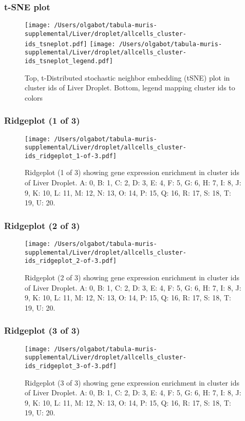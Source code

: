 \clearpage
\subsubsection{t-SNE plot}
\begin{figure}[h]
\centering
\texttt{[image: /Users/olgabot/tabula-muris-supplemental/Liver/droplet/allcells\_cluster-ids\_tsneplot.pdf]}
\texttt{[image: /Users/olgabot/tabula-muris-supplemental/Liver/droplet/allcells\_cluster-ids\_tsneplot\_legend.pdf]}
\caption{Top, t-Distributed stochastic neighbor embedding (tSNE) plot  in cluster ids of Liver Droplet. Bottom, legend mapping cluster ids to colors}
\end{figure}


\clearpage
\clearpage
\subsubsection{Ridgeplot (1 of 3)}
\begin{figure}[h]
\centering
\texttt{[image: /Users/olgabot/tabula-muris-supplemental/Liver/droplet/allcells\_cluster-ids\_ridgeplot\_1-of-3.pdf]}

\caption{ Ridgeplot (1 of 3)  showing gene expression enrichment in cluster ids of Liver Droplet. A: 0, B: 1, C: 2, D: 3, E: 4, F: 5, G: 6, H: 7, I: 8, J: 9, K: 10, L: 11, M: 12, N: 13, O: 14, P: 15, Q: 16, R: 17, S: 18, T: 19, U: 20.}
\end{figure}


\clearpage
\clearpage
\subsubsection{Ridgeplot (2 of 3)}
\begin{figure}[h]
\centering
\texttt{[image: /Users/olgabot/tabula-muris-supplemental/Liver/droplet/allcells\_cluster-ids\_ridgeplot\_2-of-3.pdf]}

\caption{ Ridgeplot (2 of 3)  showing gene expression enrichment in cluster ids of Liver Droplet. A: 0, B: 1, C: 2, D: 3, E: 4, F: 5, G: 6, H: 7, I: 8, J: 9, K: 10, L: 11, M: 12, N: 13, O: 14, P: 15, Q: 16, R: 17, S: 18, T: 19, U: 20.}
\end{figure}


\clearpage
\clearpage
\subsubsection{Ridgeplot (3 of 3)}
\begin{figure}[h]
\centering
\texttt{[image: /Users/olgabot/tabula-muris-supplemental/Liver/droplet/allcells\_cluster-ids\_ridgeplot\_3-of-3.pdf]}

\caption{ Ridgeplot (3 of 3)  showing gene expression enrichment in cluster ids of Liver Droplet. A: 0, B: 1, C: 2, D: 3, E: 4, F: 5, G: 6, H: 7, I: 8, J: 9, K: 10, L: 11, M: 12, N: 13, O: 14, P: 15, Q: 16, R: 17, S: 18, T: 19, U: 20.}
\end{figure}


